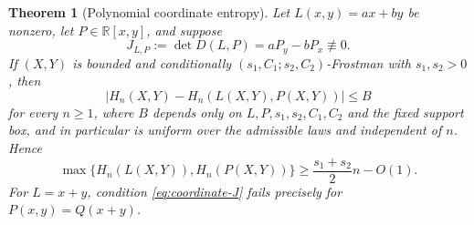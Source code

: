 \documentclass[11pt]{article}
\newtheorem{theorem}{Theorem}[section]
\begin{document}
\begin{theorem}[Polynomial coordinate entropy]
\label{thm:coordinate-entropy}
Let \(L(x,y)=ax+by\) be nonzero, let \(P\in\mathbb R[x,y]\), and suppose
\begin{equation}
 J_{L,P}:=\det D(L,P)=aP_y-bP_x\not\equiv0.
 \label{eq:coordinate-J}
\end{equation}
If \((X,Y)\) is bounded and conditionally
\((s_1,C_1;s_2,C_2)\)-Frostman with \(s_1,s_2>0\), then
\begin{equation}
 \bigl|H_n(X,Y)-H_n(L(X,Y),P(X,Y))\bigr|\le B
 \label{eq:coordinate-recovery}
\end{equation}
for every \(n\ge1\), where \(B\) depends only on
\(L,P,s_1,s_2,C_1,C_2\) and the fixed support box, and in particular
is uniform over the admissible laws and independent of \(n\).  Hence
\begin{equation}
 \max\{H_n(L(X,Y)),H_n(P(X,Y))\}
 \ge\frac{s_1+s_2}{2}n-O(1).
 \label{eq:coordinate-baseline}
\end{equation}
For \(L=x+y\), condition \eqref{eq:coordinate-J} fails precisely
for \(P(x,y)=Q(x+y)\).
\end{theorem}
\end{document}

